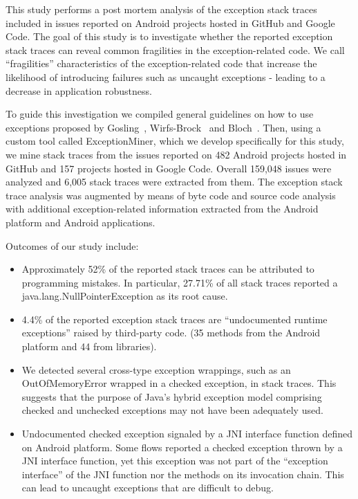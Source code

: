 \documentclass[conference]{IEEEtran}
\begin{document}
This study performs a post mortem analysis of the exception stack traces 
included in issues
reported on Android projects hosted in GitHub and Google Code. 
The goal of this study is to investigate whether the reported exception stack traces
 can reveal common fragilities in the exception-related code.  
We call ``fragilities'' characteristics of the exception-related code 
that increase the likelihood of introducing failures such as uncaught 
exceptions -  leading to a decrease in application robustness.

To guide this investigation we compiled general guidelines on how to use
exceptions proposed by Gosling~\cite{gosling2000java},
Wirfs-Brock~\cite{wirfs2006toward} and Bloch~\cite{bloch2008effective}.
Then, using a custom tool called ExceptionMiner,
 which we develop specifically for this study, we mine stack traces from the issues reported 
on 482 Android projects hosted in GitHub and 157 projects hosted in Google Code.
Overall 159,048 issues were analyzed and 6,005 stack traces were extracted from them.
The exception stack trace analysis was augmented by means of byte code 
and source code analysis
 with additional exception-related information
extracted from the Android platform and Android applications.

Outcomes of our study include:





\begin{itemize}

       \item Approximately 52\% of the reported stack traces can be attributed to programming mistakes. 
In particular, 27.71\% of all stack traces reported a java.lang.NullPointerException as its root cause.

       \item  4.4\% of the reported exception stack traces are ``undocumented runtime exceptions'' raised by third-party code. 
             (35 methods from the Android platform and 44 from libraries). 

     \item  We detected several cross-type exception wrappings, such as an OutOfMemoryError wrapped in a checked exception,
in stack traces. This suggests that the purpose of Java's hybrid exception model comprising checked and unchecked exceptions may not have been adequately used.

   \item Undocumented checked exception signaled by a  JNI interface function defined on Android platform. 
    Some flows reported a checked exception thrown by a JNI interface function, yet this exception was not  
    part of the ``exception interface'' of the JNI function nor the methods on its invocation chain. This can lead to 
   uncaught exceptions that are difficult to debug. 

\end{itemize}
\end{document}
